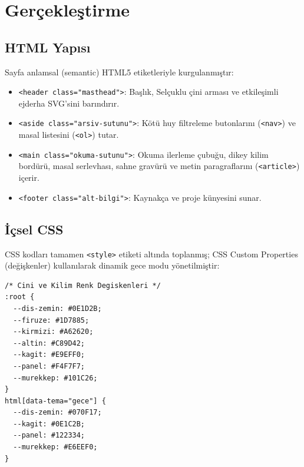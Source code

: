 \documentclass[11pt,a4paper]{article}
\begin{document}
\section{Gerçekleştirme}

\subsection{HTML Yapısı}
Sayfa anlamsal (semantic) HTML5 etiketleriyle kurgulanmıştır:
\begin{itemize}
    \item \texttt{<header class="masthead">}: Başlık, Selçuklu çini arması ve etkileşimli ejderha SVG'sini barındırır.
    \item \texttt{<aside class="arsiv-sutunu">}: Kötü huy filtreleme butonlarını (\texttt{<nav>}) ve masal listesini (\texttt{<ol>}) tutar.
    \item \texttt{<main class="okuma-sutunu">}: Okuma ilerleme çubuğu, dikey kilim bordürü, masal serlevhası, sahne gravürü ve metin paragraflarını (\texttt{<article>}) içerir.
    \item \texttt{<footer class="alt-bilgi">}: Kaynakça ve proje künyesini sunar.
\end{itemize}

\newpage
\subsection{İçsel CSS}
CSS kodları tamamen \texttt{<style>} etiketi altında toplanmış; CSS Custom Properties (değişkenler) kullanılarak dinamik gece modu yönetilmiştir:
\begin{lstlisting}[language=HTML]
/* Cini ve Kilim Renk Degiskenleri */
:root {
  --dis-zemin: #0E1D2B;
  --firuze: #1D7885;
  --kirmizi: #A62620;
  --altin: #C89D42;
  --kagit: #E9EFF0;
  --panel: #F4F7F7;
  --murekkep: #101C26;
}
html[data-tema="gece"] {
  --dis-zemin: #070F17;
  --kagit: #0E1C2B;
  --panel: #122334;
  --murekkep: #E6EEF0;
}
\end{lstlisting}
\end{document}
